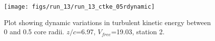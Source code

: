 \begin{figure}[H]
\centering
\texttt{[image: figs/run\_13/run\_13\_ctke\_05rdynamic]}
\caption{Plot showing dynamic variations in turbulent kinetic energy between 0 and 0.5 core radii. $z/c$=6.97, $V_{free}$=19.03, station 2.}
\label{fig:run_13_ctke_05rdynamic}
\end{figure}


